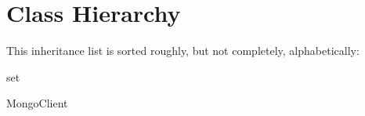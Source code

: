 \section{Class Hierarchy}
This inheritance list is sorted roughly, but not completely, alphabetically\+:\begin{DoxyCompactList}
\item set\begin{DoxyCompactList}
\item {}
\end{DoxyCompactList}
\item {}
\item Mongo\+Client\begin{DoxyCompactList}
\item {}
\end{DoxyCompactList}
\end{DoxyCompactList}
